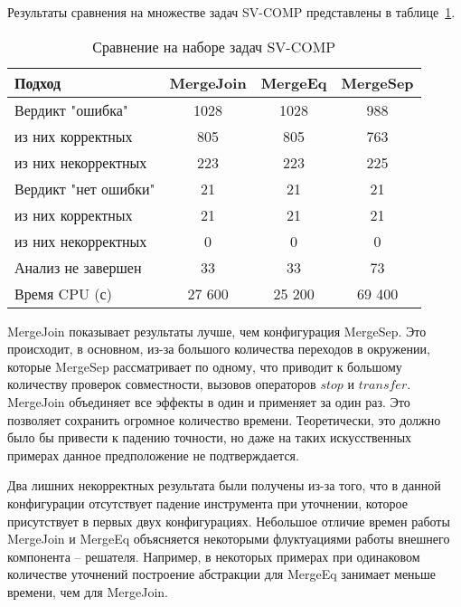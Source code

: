 Результаты сравнения на множестве задач SV-COMP представлены в таблице~\ref{table-sv-comp-merge}.

  \begin{table}[h]\footnotesize \centering
    \caption{Сравнение на наборе задач SV-COMP}
  	\label{table-sv-comp-merge}
    \begin{tabular}{ | l | c | c | c | }
      \hline
      Подход         				& MergeJoin & MergeEq 	& MergeSep   \\ \hline
      Вердикт "ошибка" 				& 1028    	& 1028		& 988         \\ 
  \hspace{0.5cm} из них корректных 	& 805 		& 805 		& 763      \\ 
  \hspace{0.5cm} из них некорректных & 223 		& 223 		& 225        \\ \hline
      Вердикт "нет ошибки"  		& 21      	& 21        & 21       \\ 
  \hspace{0.5cm} из них корректных 	& 21 		& 21    	& 21        \\
  \hspace{0.5cm} из них некорректных & 0 		& 0    		& 0         \\ \hline
      Анализ не завершен       		& 33     	& 33        & 73       \\ \hline
      Время CPU (с)   				& 27 600 	& 25 200    & 69 400    \\ 
      \hline
    \end{tabular}
  \end{table}

MergeJoin показывает результаты лучше, чем конфигурация MergeSep.
Это происходит, в основном, из-за большого количества переходов в окружении, которые MergeSep рассматривает по одному, что приводит к большому количеству проверок совместности, вызовов операторов $stop$ и $transfer$.
MergeJoin объединяет все эффекты в один и применяет за один раз. Это позволяет сохранить огромное количество времени. Теоретически, это должно было бы привести к падению точности, но даже на таких искусственных примерах данное предположение не подтверждается.

Два лишних некорректных результата были получены из-за того, что в данной конфигурации отсутствует падение инструмента при уточнении, которое присутствует в первых двух конфигурациях.
Небольшое отличие времен работы MergeJoin и MergeEq объясняется некоторыми флуктуациями работы внешнего компонента -- решателя. 
Например, в некоторых примерах при одинаковом количестве уточнений построение абстракции для MergeEq занимает меньше времени, чем для MergeJoin.

